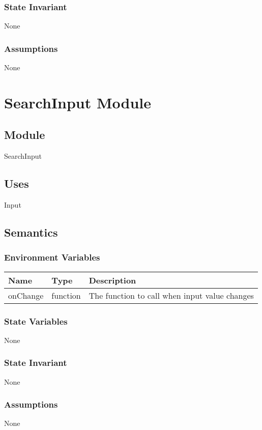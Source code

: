 \documentclass[12pt]{article}
\begin{document}
\subsubsection{State Invariant}
None

\subsubsection{Assumptions}
None

\newpage

\section{SearchInput Module}

\subsection{Module}
SearchInput

\subsection{Uses}
Input

\subsection{Semantics}

\subsubsection{Environment Variables}
\begin{tabular}{| l | l | p{10cm} |}
    \hline
    \textbf{Name} & \textbf{Type} & \textbf{Description}\\ \hline
    onChange & function & The function to call when input value changes\\ \hline
\end{tabular}

\subsubsection{State Variables}
None

\subsubsection{State Invariant}
None

\subsubsection{Assumptions}
None
\end{document}
